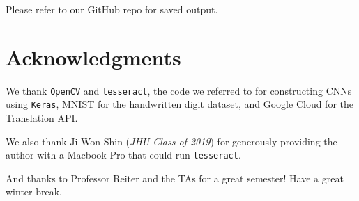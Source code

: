 \documentclass[11pt,letterpaper]{article}
\begin{document}
Please refer to our GitHub repo for saved output.

\section*{Acknowledgments}

We thank {\tt OpenCV} and {\tt tesseract}, the code we referred to for constructing CNNs using {\tt Keras},  MNIST for the handwritten digit dataset, and Google Cloud for the Translation API.

We also thank Ji Won Shin (\textit{JHU Class of 2019}) for generously providing the author with a Macbook Pro that could run {\tt tesseract}.

And thanks to Professor Reiter and the TAs for a great semester! Have a great winter break.
\end{document}
